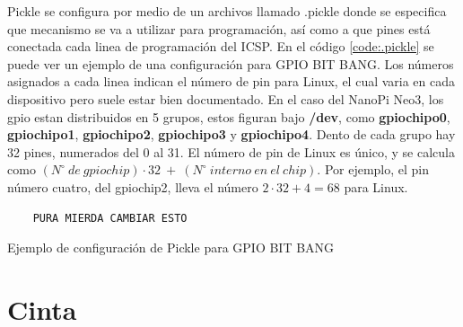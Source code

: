 \documentclass[12pt,letterpaper]{article}     %
\begin{document}
Pickle se configura por medio de un archivos llamado .pickle donde se especifica que mecanismo se va a utilizar 
para programación, así como a que pines está conectada cada linea de programación del ICSP. En el código 
\ref{code:.pickle} se puede ver un ejemplo de una configuración para GPIO BIT BANG.
Los números asignados a cada linea indican el número de pin para Linux, el cual varia en cada dispositivo pero
suele estar bien documentado. En el caso del NanoPi Neo3, los gpio estan distribuidos en 5 grupos, estos figuran 
bajo \textbf{/dev}, como \textbf{gpiochipo0}, \textbf{gpiochipo1}, \textbf{gpiochipo2}, \textbf{gpiochipo3} y
\textbf{gpiochipo4}. Dento de cada grupo hay 32 pines, numerados del 0 al 31. El número de pin de Linux es único,
y se calcula como $(N^\circ\ de\ gpiochip)\cdot32\ +\ (N^\circ\ interno\ en\ el\ chip)$. Por ejemplo, el pin número
cuatro, del gpiochip2, lleva el número $2\cdot32+4=68$ para Linux.

\begin{codigo}[!h]
	\begin{lstlisting}
	PURA MIERDA CAMBIAR ESTO
	\end{lstlisting}
	\caption{Ejemplo de configuración de Pickle para GPIO BIT BANG}
	\label{code:.pickle}
\end{codigo}

\section{Cinta}
\end{document}
